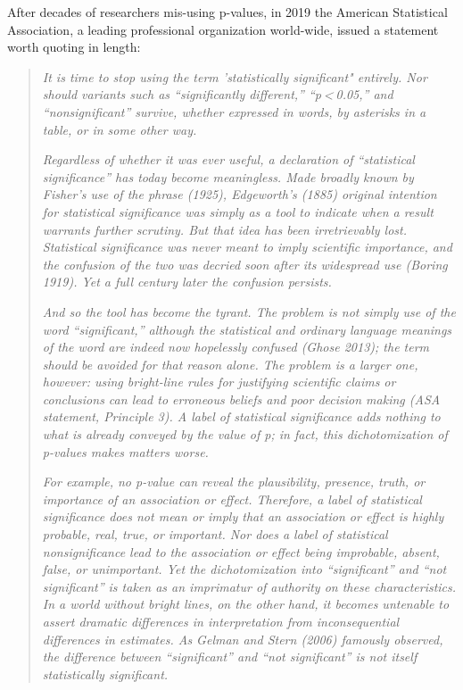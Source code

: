 \documentclass[]{book}
\begin{document}
After decades of researchers mis-using p-values, in 2019 the American Statistical Association, a leading professional organization world-wide, issued a statement worth quoting in length:

\begin{quote}
\emph{It is time to stop using the term 'statistically significant" entirely. Nor should variants such as ``significantly different,'' ``p \textless{} 0.05,'' and ``nonsignificant'' survive, whether expressed in words, by asterisks in a table, or in some other way.}

\emph{Regardless of whether it was ever useful, a declaration of ``statistical significance'' has today become meaningless. Made broadly known by Fisher's use of the phrase (1925), Edgeworth's (1885) original intention for statistical significance was simply as a tool to indicate when a result warrants further scrutiny. But that idea has been irretrievably lost. Statistical significance was never meant to imply scientific importance, and the confusion of the two was decried soon after its widespread use (Boring 1919). Yet a full century later the confusion persists.}

\emph{And so the tool has become the tyrant. The problem is not simply use of the word ``significant,'' although the statistical and ordinary language meanings of the word are indeed now hopelessly confused (Ghose 2013); the term should be avoided for that reason alone. The problem is a larger one, however: using bright-line rules for justifying scientific claims or conclusions can lead to erroneous beliefs and poor decision making (ASA statement, Principle 3). A label of statistical significance adds nothing to what is already conveyed by the value of p; in fact, this dichotomization of p-values makes matters worse.}

\emph{For example, no p-value can reveal the plausibility, presence, truth, or importance of an association or effect. Therefore, a label of statistical significance does not mean or imply that an association or effect is highly probable, real, true, or important. Nor does a label of statistical nonsignificance lead to the association or effect being improbable, absent, false, or unimportant. Yet the dichotomization into ``significant'' and ``not significant'' is taken as an imprimatur of authority on these characteristics. In a world without bright lines, on the other hand, it becomes untenable to assert dramatic differences in interpretation from inconsequential differences in estimates. As Gelman and Stern (2006) famously observed, the difference between ``significant'' and ``not significant'' is not itself statistically significant.}


\end{quote}
\end{document}
